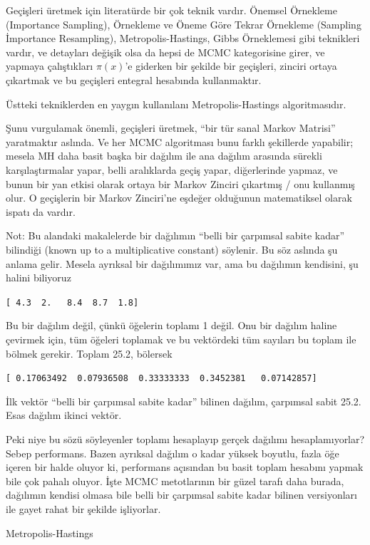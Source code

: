 \documentclass[12pt,fleqn]{article}\usepackage{../../common}
\begin{document}
Geçişleri üretmek için literatürde bir çok teknik vardır.  Önemsel
Örnekleme (Importance Sampling), Örnekleme ve Öneme Göre Tekrar Örnekleme
(Sampling İmportance Resampling), Metropolis-Hastings, Gibbs Örneklemesi
gibi teknikleri vardır, ve detayları değişik olsa da hepsi de MCMC
kategorisine girer, ve yapmaya çalıştıkları $\pi(x)$'e giderken bir şekilde
bir geçişleri, zinciri ortaya çıkartmak ve bu geçişleri entegral hesabında
kullanmaktır.

Üstteki tekniklerden en yaygın kullanılanı Metropolis-Hastings
algoritmasıdır. 

Şunu vurgulamak önemli, geçişleri üretmek, ``bir tür sanal Markov Matrisi''
yaratmaktır aslında. Ve her MCMC algoritması bunu farklı şekillerde
yapabilir; mesela MH daha basit başka bir dağılım ile ana dağılım arasında
sürekli karşılaştırmalar yapar, belli aralıklarda geçiş yapar, diğerlerinde
yapmaz, ve bunun bir yan etkisi olarak ortaya bir Markov Zinciri çıkartmış
/ onu kullanmış olur. O geçişlerin bir Markov Zinciri'ne eşdeğer olduğunun
matematiksel olarak ispatı da vardır.

Not: Bu alandaki makalelerde bir dağılımın ``belli bir çarpımsal sabite
kadar'' bilindiği (known up to a multiplicative constant) söylenir. Bu söz
aslında şu anlama gelir. Mesela ayrıksal bir dağılımımız var, ama bu
dağılımın kendisini, şu halini biliyoruz

\verb![ 4.3  2.   8.4  8.7  1.8]!

Bu bir dağılım değil, çünkü öğelerin toplamı 1 değil. Onu bir dağılım
haline çevirmek için, tüm öğeleri toplamak ve bu vektördeki tüm sayıları bu
toplam ile bölmek gerekir. Toplam 25.2, bölersek

\verb![ 0.17063492  0.07936508  0.33333333  0.3452381   0.07142857]!

İlk vektör ``belli bir çarpımsal sabite kadar'' bilinen dağılım, çarpımsal
sabit 25.2. Esas dağılım ikinci vektör. 

Peki niye bu sözü söyleyenler toplamı hesaplayıp gerçek dağılımı
hesaplamıyorlar? Sebep performans. Bazen ayrıksal dağılım o kadar yüksek
boyutlu, fazla öğe içeren bir halde oluyor ki, performans açısından bu
basit toplam hesabını yapmak bile çok pahalı oluyor. İşte MCMC metotlarının
bir güzel tarafı daha burada, dağılımın kendisi olmasa bile belli bir
çarpımsal sabite kadar bilinen versiyonları ile gayet rahat bir şekilde
işliyorlar.

Metropolis-Hastings
\end{document}
